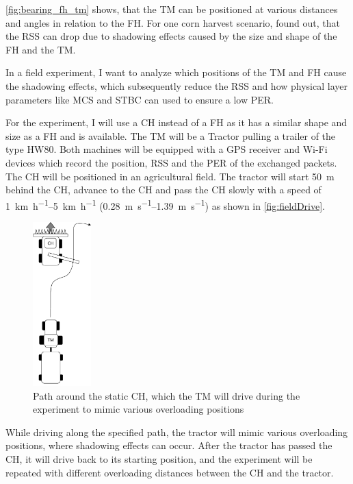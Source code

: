 \autoref{fig:bearing_fh_tm} shows, that the \ac{TM} can be positioned at various distances and angles in relation to the \ac{FH}.
For one corn harvest scenario, \textcite{klingler_agriculture_2018} found out, that the \ac{RSS} can drop due to
shadowing effects caused by the size and shape of the \ac{FH} and the \ac{TM}.

In a field experiment, I want to analyze which positions of the \ac{TM} and \ac{FH} cause the shadowing effects, which
subsequently reduce the \ac{RSS} and how physical layer parameters like \ac{MCS} and \ac{STBC} can used to ensure a low
\ac{PER}.

For the experiment, I will use a \ac{CH} instead of a \ac{FH} as it has a similar shape and size as a \ac{FH} and is available.
The \ac{TM} will be a Tractor pulling a trailer of the type HW80.
Both machines will be equipped with a \ac{GPS} receiver and Wi-Fi devices which record the position, \ac{RSS} and the \ac{PER} of the
exchanged packets.
The \ac{CH} will be positioned in an agricultural field.
The tractor will start \SI{50}{\metre} behind the \ac{CH}, advance to the \ac{CH} and pass the \ac{CH} slowly with a
speed of \SIrange{1}{5}{\kilo\metre\per\hour} (\SIrange{0.28}{1.39}{\metre\per\second}) as shown in \autoref{fig:fieldDrive}.
\begin{figure}[]%
	\centering
	\includegraphics[width=0.2\textwidth]{figures/FieldExperimentDrive}
	\caption{Path around the static \acf{CH}, which the \acf{TM} will drive during the experiment to mimic various overloading positions}%
	\label{fig:fieldDrive}
\end{figure}
While driving along the specified path, the tractor will mimic various overloading positions, where shadowing effects can occur. After the tractor has passed the \ac{CH},
it will drive back to its starting position, and the experiment will be repeated with different overloading distances between the \ac{CH} and the tractor.

